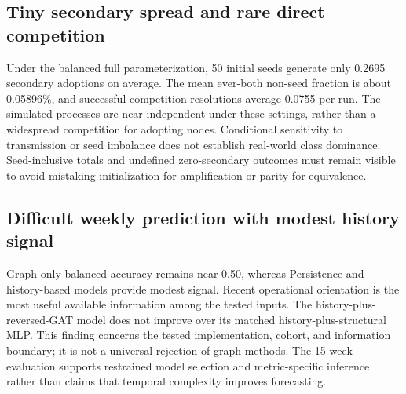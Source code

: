 \documentclass[11pt,a4paper]{article}
\begin{document}
\subsection{Tiny secondary spread and rare direct competition}
Under the balanced full parameterization, 50 initial seeds generate only 0.2695 secondary adoptions on average. The mean ever-both non-seed fraction is about 0.05896\%, and successful competition resolutions average 0.0755 per run. The simulated processes are near-independent under these settings, rather than a widespread competition for adopting nodes. Conditional sensitivity to transmission or seed imbalance does not establish real-world class dominance. Seed-inclusive totals and undefined zero-secondary outcomes must remain visible to avoid mistaking initialization for amplification or parity for equivalence.

\subsection{Difficult weekly prediction with modest history signal}
Graph-only balanced accuracy remains near 0.50, whereas Persistence and history-based models provide modest signal. Recent operational orientation is the most useful available information among the tested inputs. The history-plus-reversed-GAT model does not improve over its matched history-plus-structural MLP. This finding concerns the tested implementation, cohort, and information boundary; it is not a universal rejection of graph methods. The 15-week evaluation supports restrained model selection and metric-specific inference rather than claims that temporal complexity improves forecasting.
\end{document}

